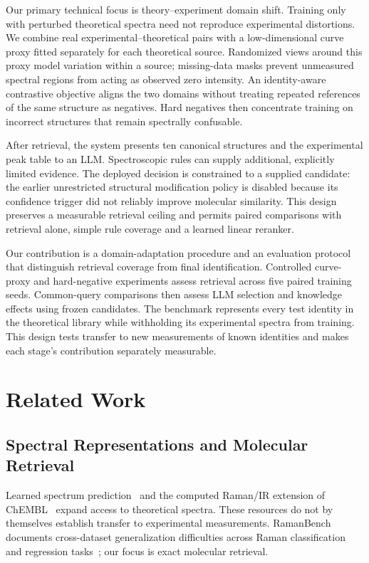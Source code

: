 \documentclass[conference]{IEEEtran}
\begin{document}
Our primary technical focus is theory--experiment domain shift. Training only with perturbed theoretical spectra need not reproduce experimental distortions. We combine real experimental--theoretical pairs with a low-dimensional curve proxy fitted separately for each theoretical source. Randomized views around this proxy model variation within a source; missing-data masks prevent unmeasured spectral regions from acting as observed zero intensity. An identity-aware contrastive objective aligns the two domains without treating repeated references of the same structure as negatives. Hard negatives then concentrate training on incorrect structures that remain spectrally confusable.

After retrieval, the system presents ten canonical structures and the experimental peak table to an LLM. Spectroscopic rules can supply additional, explicitly limited evidence. The deployed decision is constrained to a supplied candidate: the earlier unrestricted structural modification policy is disabled because its confidence trigger did not reliably improve molecular similarity. This design preserves a measurable retrieval ceiling and permits paired comparisons with retrieval alone, simple rule coverage and a learned linear reranker.

Our contribution is a domain-adaptation procedure and an evaluation protocol that distinguish retrieval coverage from final identification. Controlled curve-proxy and hard-negative experiments assess retrieval across five paired training seeds. Common-query comparisons then assess LLM selection and knowledge effects using frozen candidates. The benchmark represents every test identity in the theoretical library while withholding its experimental spectra from training. This design tests transfer to new measurements of known identities and makes each stage's contribution separately measurable.

\section{Related Work}\label{sec:related}
\subsection{Spectral Representations and Molecular Retrieval}
Learned spectrum prediction~\cite{zou2023deep} and the computed Raman/IR extension of ChEMBL~\cite{liang2025dataset} expand access to theoretical spectra. These resources do not by themselves establish transfer to experimental measurements. RamanBench documents cross-dataset generalization difficulties across Raman classification and regression tasks~\cite{koddenbrock2026ramanbench}; our focus is exact molecular retrieval.
\end{document}
